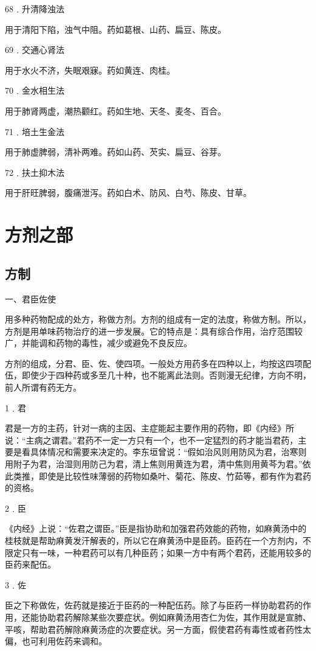\documentclass[a4paper,12pt,UTF8,twoside]{ctexbook}
\begin{document}
68﹒升清降浊法

用于清阳下陷，浊气中阻。药如葛根、山药、扁豆、陈皮。

69﹒交通心肾法

用于水火不济，失眠艰寐。药如黄连、肉桂。

70﹒金水相生法

用于肺肾两虚，潮热颧红。药如生地、天冬、麦冬、百合。

71﹒培土生金法

用于肺虚脾弱，清补两难。药如山药、芡实、扁豆、谷芽。

72﹒扶土抑木法

用于肝旺脾弱，腹痛泄泻。药如白术、防风、白芍、陈皮、甘草。

\chapter{方剂之部}

\section{方制}

一、君臣佐使

用多种药物配成的处方，称做方剂。方剂的组成有一定的法度，称做方制。所以，方剂是用单味药物治疗的进一步发展。它的特点是：具有综合作用，治疗范围较广，并能调和药物的毒性，减少或避免不良反应。

方剂的组成，分君、臣、佐、使四项。一般处方用药多在四种以上，均按这四项配伍，即使少于四种药或多至几十种，也不能离此法则。否则漫无纪律，方向不明，前人所谓有药无方。

1﹒君

君是一方的主药，针对一病的主因、主症能起主要作用的药物，即《内经》所说：“主病之谓君。”君药不一定一方只有一个，也不一定猛烈的药才能当君药，主要是看具体情况和需要来决定的。李东垣曾说：“假如治风则用防风为君，治寒则用附子为君，治湿则用防己为君，清上焦则用黄连为君，清中焦则用黄芩为君。”依此类推，即使是比较性味薄弱的药物如桑叶、菊花、陈皮、竹茹等，都有作为君药的资格。

2﹒臣

《内经》上说：“佐君之谓臣。”臣是指协助和加强君药效能的药物，如麻黄汤中的桂枝就是帮助麻黄发汗解表的，所以它在麻黄汤中是臣药。臣药在一个方剂内，不限定只有一味，一种君药可以有几种臣药；如果一方中有两个君药，还能用较多的臣药来配伍。

3﹒佐

臣之下称做佐，佐药就是接近于臣药的一种配伍药。除了与臣药一样协助君药的作用，还能协助君药解除某些次要症状。例如麻黄汤用杏仁为佐，其作用就是宣肺、平咳，帮助君药解除麻黄汤症的次要症状。另一方面，假使君药有毒性或者药性太偏，也可利用佐药来调和。
\end{document}
